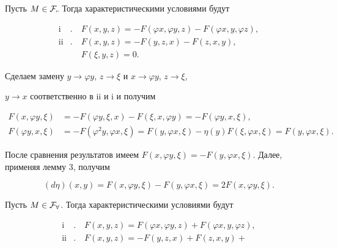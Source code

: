 \begin{pf} 


Пусть $M\in\cal F_7$. Тогда характеристическими условиями будут 


\begin{align*} 


\text{i}&.\quad F(x,y,z)=-F(\varphi x,\varphi y,z)- 


F(\varphi x,y,\varphi z),\\ 


\text{ii}&.\quad F(x,y,z)=-F(y,z,x)-F(z,x,y),\\ 


&\phantom{.}\quad F(\xi,y,z)=0. 


\end{align*} 


Сделаем замену $y\to\varphi y$, $z\to\xi$ и $x\to\varphi y$, $z\to\xi$, 


$y\to x$ соответственно в ii и i и получим 


\begin{align*} 


F(x,\varphi y,\xi)&=-F(\varphi y,\xi,x)- 


F(\xi,x,\varphi y)=-F(\varphi y,x,\xi),\\ 


F(\varphi y,x,\xi)&=-F(\varphi ^2y,\varphi x,\xi)= 


F(y,\varphi x,\xi)-\eta(y)F(\xi,\varphi x,\xi)= 


F(y,\varphi x,\xi). 


\end{align*} 


После сравнения результатов имеем $F(x,\varphi y,\xi)=-F(y,\varphi 


x,\xi)$. Далее, применяя лемму 3, получим 


$$ 


(d\eta)(x,y)=F(x,\varphi y,\xi)-F(y,\varphi x,\xi)= 


2F(x,\varphi y,\xi). 


$$ 


 


Пусть $M\in\cal F_8$. Тогда характеристическими условиями будут 


\begin{align*} 


\text{i}&.\quad F(x,y,z)=F(\varphi x,\varphi y,z)+ 


F(\varphi x,y,\varphi z),\\ 


\text{ii}&.\quad F(x,y,z)=-F(y,z,x)+F(z,x,y)+ 



\end{align*}
\end{pf}
